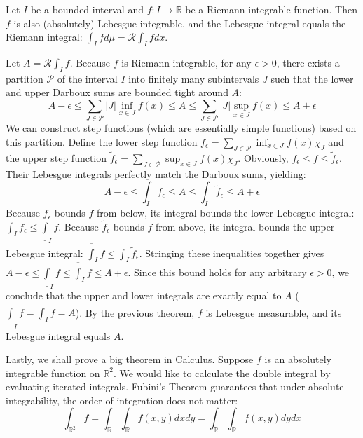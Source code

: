 \begin{theorem}
    Let $I$ be a bounded interval and $f: I \rightarrow \mathbb{R}$ be a Riemann integrable function. Then $f$ is also (absolutely) Lebesgue integrable, and the Lebesgue integral equals the Riemann integral: $\int_I f d\mu = \mathcal{R}\int_I f dx$.
\end{theorem}
\begin{pfbox}
    Let $A = \mathcal{R}\int_I f$. Because $f$ is Riemann integrable, for any $\epsilon > 0$, there exists a partition $\mathcal{P}$ of the interval $I$ into finitely many subintervals $J$ such that the lower and upper Darboux sums are bounded tight around $A$:
    $$ A - \epsilon \le \displaystyle\sum_{J \in \mathcal{P}} |J| \inf_{x \in J} f(x) \le A \le \displaystyle\sum_{J \in \mathcal{P}} |J| \sup_{x \in J} f(x) \le A + \epsilon $$
    We can construct step functions (which are essentially simple functions) based on this partition. Define the lower step function $f_\epsilon = \displaystyle\sum_{J \in \mathcal{P}} \inf_{x \in J} f(x) \chi_J$ and the upper step function $\tilde{f}_\epsilon = \displaystyle\sum_{J \in \mathcal{P}} \sup_{x \in J} f(x) \chi_J$.
    Obviously, $f_\epsilon \le f \le \tilde{f}_\epsilon$. Their Lebesgue integrals perfectly match the Darboux sums, yielding:
    $$ A - \epsilon \le \int_I f_\epsilon \le A \le \int_I \tilde{f}_\epsilon \le A + \epsilon $$
    Because $f_\epsilon$ bounds $f$ from below, its integral bounds the lower Lebesgue integral: $\int_I f_\epsilon \le \underline{\int}_I f$. Because $\tilde{f}_\epsilon$ bounds $f$ from above, its integral bounds the upper Lebesgue integral: $\overline{\int}_I f \le \int_I \tilde{f}_\epsilon$.
    Stringing these inequalities together gives $A - \epsilon \le \underline{\int}_I f \le \overline{\int}_I f \le A + \epsilon$.
    Since this bound holds for any arbitrary $\epsilon > 0$, we conclude that the upper and lower integrals are exactly equal to $A$ ($\underline{\int}_I f = \overline{\int}_I f = A$). By the previous theorem, $f$ is Lebesgue measurable, and its Lebesgue integral equals $A$.
\end{pfbox}

Lastly, we shall prove a big theorem in Calculus.
Suppose $f$ is an absolutely integrable function on $\mathbb{R}^2$. We would like to calculate the double integral by evaluating iterated integrals. Fubini's Theorem guarantees that under absolute integrability, the order of integration does not matter:
$$ \int_{\mathbb{R}^2} f = \int_\mathbb{R} \int_\mathbb{R} f(x,y) dx dy = \int_\mathbb{R} \int_\mathbb{R} f(x,y) dy dx $$

